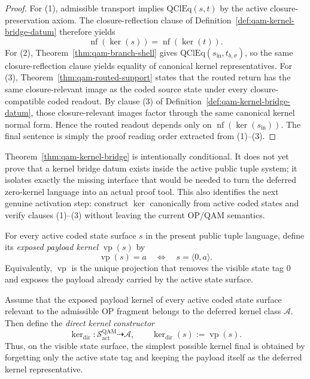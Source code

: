 \begin{proof}
For (1), admissible transport implies $\mathrm{QClEq}(s,t)$ by the active closure-preservation axiom. The closure-reflection clause of Definition~\ref{def:qam-kernel-bridge-datum} therefore yields
\[
\operatorname{nf}(\operatorname{ker}(s))=\operatorname{nf}(\operatorname{ker}(t)).
\]
For (2), Theorem~\ref{thm:qam-branch-shell} gives $\mathrm{QClEq}(s_{\mathrm{in}},t_{b,\sigma})$, so the same closure-reflection clause yields equality of canonical kernel representatives. For (3), Theorem~\ref{thm:qam-routed-support} states that the routed return has the same closure-relevant image as the coded source state under every closure-compatible coded readout. By clause (3) of Definition~\ref{def:qam-kernel-bridge-datum}, those closure-relevant images factor through the same canonical kernel normal form. Hence the routed readout depends only on $\operatorname{nf}(\operatorname{ker}(s_{\mathrm{in}}))$. The final sentence is simply the proof reading order extracted from (1)--(3).
\end{proof}

\begin{remark}\label{rem:qam-kernel-bridge-open}
Theorem~\ref{thm:qam-kernel-bridge} is intentionally conditional. It does not yet prove that a kernel bridge datum exists inside the active public tuple system; it isolates exactly the missing interface that would be needed to turn the deferred zero-kernel language into an actual proof tool. This also identifies the next genuine activation step: construct $\operatorname{ker}$ canonically from active coded states and verify clauses (1)--(3) without leaving the current OP/QAM semantics.
\end{remark}


\begin{definition}\label{def:qam-visible-payload}
For every active coded state surface $s$ in the present public tuple language, define its \emph{exposed payload kernel} $\operatorname{vp}(s)$ by
\[
\operatorname{vp}(s)=a \quad\Longleftrightarrow\quad s=\langle 0,a\rangle.
\]
Equivalently, $\operatorname{vp}$ is the unique projection that removes the visible state tag $0$ and exposes the payload already carried by the active state surface.
\end{definition}

\begin{definition}\label{def:qam-direct-kernel-constructor}
Assume that the exposed payload kernel of every active coded state surface relevant to the admissible OP fragment belongs to the deferred kernel class $\mathcal A$. Then define the \emph{direct kernel constructor}
\[
\operatorname{ker}_{\mathrm{dir}} : \mathcal S^{\mathrm{QAM}}_{\mathrm{act}} \dashrightarrow \mathcal A,
\qquad
\operatorname{ker}_{\mathrm{dir}}(s):=\operatorname{vp}(s).
\]
Thus, on the visible state surface, the simplest possible kernel final is obtained by forgetting only the active state tag and keeping the payload itself as the deferred kernel representative.
\end{definition}

